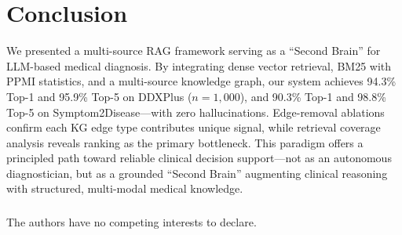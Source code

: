 \documentclass[runningheads]{llncs}
\begin{document}
\section{Conclusion}
\label{sec:conclusion}

We presented a multi-source RAG framework serving as a ``Second Brain'' for LLM-based medical diagnosis. By integrating dense vector retrieval, BM25 with PPMI statistics, and a multi-source knowledge graph, our system achieves 94.3\% Top-1 and 95.9\% Top-5 on DDXPlus ($n{=}1{,}000$), and 90.3\% Top-1 and 98.8\% Top-5 on Symptom2Disease---with zero hallucinations. Edge-removal ablations confirm each KG edge type contributes unique signal, while retrieval coverage analysis reveals ranking as the primary bottleneck. This paradigm offers a principled path toward reliable clinical decision support---not as an autonomous diagnostician, but as a grounded ``Second Brain'' augmenting clinical reasoning with structured, multi-modal medical knowledge.

\begin{credits}
\subsubsection{\discintname}
The authors have no competing interests to declare.
\end{credits}


\end{document}
